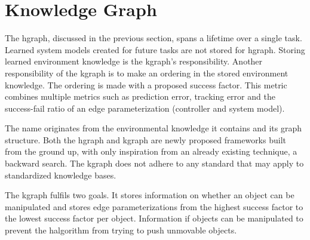 \section{Knowledge Graph}%
\label{sec:kgraph}
The \ac{hgraph}, discussed in the previous section, spans a lifetime over a single task. Learned system models created for future tasks are not stored for \ac{hgraph}. Storing learned environment knowledge is the \ac{kgraph}'s responsibility. Another responsibility of the \ac{kgraph} is to make an ordering in the stored environment knowledge. The ordering is made with a proposed success factor. This metric combines multiple metrics such as prediction error, tracking error and the success-fail ratio of an edge parameterization (controller and system model).\bs

The name  originates from the environmental knowledge it contains and its graph structure. Both the \ac{hgraph} and \ac{kgraph} are newly proposed frameworks built from the ground up, with only inspiration from an already existing technique, a backward search. The \ac{kgraph} does not adhere to any standard that may apply to standardized knowledge bases.\bs





The \ac{kgraph} fulfils two goals. It stores information on whether an object can be manipulated and stores edge parameterizations from the highest success factor to the lowest success factor per object. Information if objects can be manipulated to prevent the \ac{halgorithm} from trying to push unmovable objects.\bs
